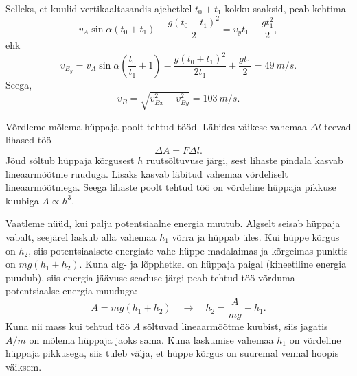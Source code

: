 \documentclass[10pt]{article}
\begin{document}
Selleks, et kuulid vertikaaltasandis ajehetkel $t_0 + t_1$ kokku saaksid, peab kehtima
\[
v_A\sin\alpha (t_0 + t_1) - \frac{g(t_0 + t_1)^2}{2} = v_yt_1 - \frac{gt_1^2}{2},
\]
ehk
\[
v_{B_y} = v_A\sin\alpha \left(\frac{t_0}{t_1} + 1\right) - \frac{g(t_0 + t_1)^2}{2t_1} + \frac{gt_1}{2} = \SI{49}{m/s}.
\]
Seega,
\[
v_B = \sqrt{v_{Bx}^2 + v_{By}^2} = \SI{103}{m/s}.
\]
\probend
\bigskip


\solu
Võrdleme mõlema hüppaja poolt tehtud tööd. Läbides väikese vahemaa $\Delta l$ teevad lihased töö
$$\Delta A = F \Delta l.$$
Jõud sõltub hüppaja kõrgusest $h$ ruutsõltuvuse järgi, sest lihaste pindala kasvab lineaarmõõtme ruuduga. Lisaks kasvab läbitud vahemaa võrdeliselt lineaarmõõtmega. Seega lihaste poolt tehtud töö on võrdeline hüppaja pikkuse kuubiga $A \propto h^3$.

Vaatleme nüüd, kui palju potentsiaalne energia muutub. Algselt seisab hüppaja vabalt, seejärel laskub alla vahemaa $h_1$ võrra ja hüppab üles. Kui hüppe kõrgus on $h_2$, siis potentsiaalsete energiate vahe hüppe madalaimas ja kõrgeimas punktis on $mg(h_1+h_2)$. Kuna alg- ja lõpphetkel on hüppaja paigal (kineetiline energia puudub), siis energia jäävuse seaduse järgi peab tehtud töö võrduma potentsiaalse energia muuduga:
$$A = mg(h_1+h_2) \quad\rightarrow\quad h_2 = \frac{A}{mg} - h_1.$$
Kuna nii mass kui tehtud töö $A$ sõltuvad lineaarmõõtme kuubist, siis jagatis $A/m$ on mõlema hüppaja jaoks sama. Kuna laskumise vahemaa $h_1$ on võrdeline hüppaja pikkusega, siis tuleb välja, et hüppe kõrgus on suuremal vennal hoopis väiksem.
\probend
\bigskip

\end{document}

